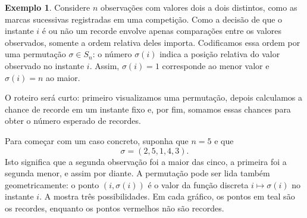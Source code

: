 \documentclass[12pt,portuguese]{article}
\theoremstyle{definition}
\newtheorem{example}[example]{Exemplo}
\begin{document}
\begin{example}\label{ex:recordes-permutacao}
Considere $n$ observações com valores dois a dois distintos, como as marcas
sucessivas registradas em uma competição. Como a decisão de que o instante
$i$ é ou não um recorde envolve apenas comparações entre os valores
observados, somente a ordem relativa deles importa. Codificamos essa ordem
por uma permutação $\sigma\in S_n$: o número $\sigma(i)$ indica a posição
relativa do valor observado no instante $i$. Assim, $\sigma(i)=1$ corresponde
ao menor valor e $\sigma(i)=n$ ao maior.

O roteiro será curto: primeiro visualizamos uma permutação, depois calculamos
a chance de recorde em um instante fixo e, por fim, somamos essas chances para
obter o número esperado de recordes.

Para começar com um caso concreto, suponha que $n=5$ e que
\[
  \sigma=(2,5,1,4,3).
\]
Isto significa que a segunda observação foi a maior das cinco, a primeira foi
a segunda menor, e assim por diante. A permutação pode ser lida também
geometricamente: o ponto $(i,\sigma(i))$ é o valor da função discreta
$i\mapsto\sigma(i)$ no instante $i$. A  mostra três
possibilidades. Em cada gráfico, os pontos em teal são os recordes, enquanto
os pontos vermelhos não são recordes.

\begin{figure}[H]
\centering
{}
\end{figure}
\end{example}
\end{document}

